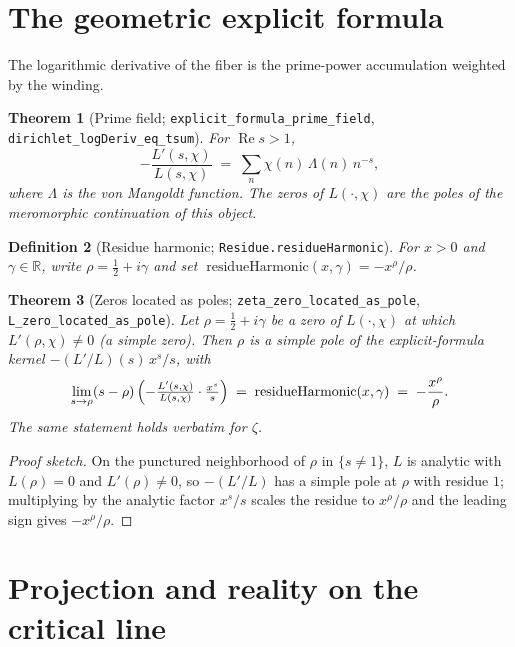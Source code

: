 \documentclass[11pt]{article}
\newtheorem{definition}{Definition}[section]
\newtheorem{theorem}[definition]{Theorem}
\DeclareMathOperator{\Ree}{Re}
\newcommand{\R}{\mathbb{R}}
\newcommand{\code}[1]{\texttt{#1}}
\begin{document}
\section{The geometric explicit formula}\label{sec:explicit}

The logarithmic derivative of the fiber is the prime-power accumulation weighted by the winding.

\begin{theorem}[Prime field; \code{explicit\_formula\_prime\_field}, \code{dirichlet\_logDeriv\_eq\_tsum}]\label{thm:primefield}
For $\Ree s>1$,
\[
  -\frac{L'(s,\chi)}{L(s,\chi)} \;=\; \sum_{n}\chi(n)\,\Lambda(n)\,n^{-s},
\]
where $\Lambda$ is the von Mangoldt function. The zeros of $L(\cdot,\chi)$ are the poles of the
meromorphic continuation of this object.
\end{theorem}

\begin{definition}[Residue harmonic; \code{Residue.residueHarmonic}]\label{def:resharm}
For $x>0$ and $\gamma\in\R$, write $\rho=\tfrac12+i\gamma$ and set
$\;\mathrm{residueHarmonic}(x,\gamma)=-x^{\rho}/\rho$.
\end{definition}

\begin{theorem}[Zeros located as poles; \code{zeta\_zero\_located\_as\_pole}, \code{L\_zero\_located\_as\_pole}]\label{thm:pole}
Let $\rho=\tfrac12+i\gamma$ be a zero of $L(\cdot,\chi)$ at which $L'(\rho,\chi)\neq 0$ (a simple
zero). Then $\rho$ is a simple pole of the explicit-formula kernel $-(L'/L)(s)\,x^{s}/s$, with
\[
  \lim_{s\to\rho}(s-\rho)\,\Bigl(-\tfrac{L'(s,\chi)}{L(s,\chi)}\cdot\tfrac{x^{s}}{s}\Bigr)
   \;=\; \mathrm{residueHarmonic}(x,\gamma)\;=\;-\frac{x^{\rho}}{\rho}.
\]
The same statement holds verbatim for $\zeta$.
\end{theorem}

\begin{proof}[Proof sketch]
On the punctured neighborhood of $\rho$ in $\{s\neq 1\}$, $L$ is analytic with $L(\rho)=0$ and
$L'(\rho)\neq0$, so $-(L'/L)$ has a simple pole at $\rho$ with residue $1$; multiplying by the
analytic factor $x^{s}/s$ scales the residue to $x^{\rho}/\rho$ and the leading sign gives
$-x^{\rho}/\rho$.
\end{proof}

\section{Projection and reality on the critical line}\label{sec:projection}
\end{document}
